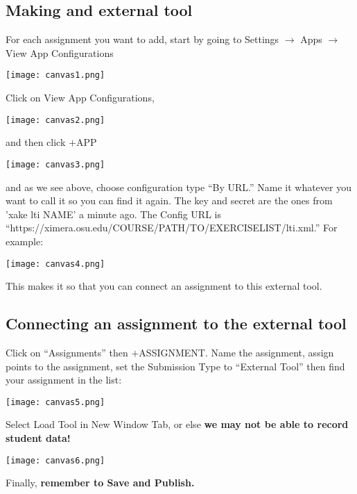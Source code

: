 \documentclass{ximera}
\begin{document}
\subsection{Making and external tool}

For each assignment you want to add, start by going to Settings $\to$  Apps $\to$ View App Configurations

\begin{image}
\texttt{[image: canvas1.png]}
\end{image}
Click on View App Configurations, 

\begin{image}
\texttt{[image: canvas2.png]}
\end{image}
and then click $+$APP
\begin{image}
\texttt{[image: canvas3.png]}
\end{image}
and as we see above, choose configuration type ``By URL.''
Name it whatever you want to call it so you can find it again.
The key and secret are the ones from 'xake lti NAME' a minute ago.
The Config URL is ``https://ximera.osu.edu/COURSE/PATH/TO/EXERCISELIST/lti.xml.'' For example:
\begin{image}
\texttt{[image: canvas4.png]}
\end{image}
This makes it so that you can connect an assignment to this external tool.

\subsection{Connecting an  assignment to the external tool}

Click on ``Assignments'' then $+$ASSIGNMENT. Name the assignment, assign points to the assignment, 
set the Submission Type to ``External Tool'' then find your assignment in the list:
\begin{image}
  \texttt{[image: canvas5.png]}
\end{image}
\begin{warning}
Select Load Tool in New Window Tab, or else \textbf{we may not be able to record student data!}
\begin{image}
  \texttt{[image: canvas6.png]}
\end{image}
\end{warning}
Finally, \textbf{remember to Save and Publish.}


        
        

        
\end{document}
